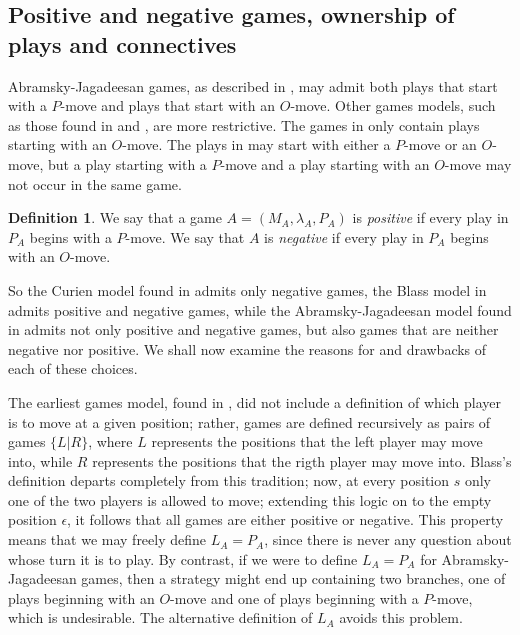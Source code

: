 \documentclass[11pt]{article} %
\theoremstyle{plain} %
\theoremstyle{definition} %
\newtheorem{definition}[theorem]{Definition}
\theoremstyle{note}
\theoremstyle{exercisestyle}
\newcommand{\emptyplay}{\epsilon}
\begin{document}
\subsection{Positive and negative games, ownership of plays and connectives}

Abramsky-Jagadeesan games, as described in \cite{abramskyjagadeesangames}, may admit both plays that start with a $P$-move and plays that start with an $O$-move.  Other games models, such as those found in \cite{blassgames} and \cite{curiengames}, are more restrictive.  The games in \cite{curiengames} only contain plays starting with an $O$-move.  The plays in \cite{blassgames} may start with either a $P$-move or an $O$-move, but a play starting with a $P$-move and a play starting with an $O$-move may not occur in the same game.

\begin{definition}
  We say that a game $A=(M_A,\lambda_A,P_A)$ is \emph{positive} if every play in $P_A$ begins with a $P$-move.
  We say that $A$ is \emph{negative} if every play in $P_A$ begins with an $O$-move.
\end{definition}

So the Curien model found in \cite{curiengames} admits only negative games, the Blass model in \cite{blassgames} admits positive and negative games, while the Abramsky-Jagadeesan model found in \cite{abramskyjagadeesangames} admits not only positive and negative games, but also games that are neither negative nor positive.  We shall now examine the reasons for and drawbacks of each of these choices.

The earliest games model, found in \cite{conwaygames}, did not include a definition of which player is to move at a given position; rather, games are defined recursively as pairs of games $\{L|R\}$, where $L$ represents the positions that the left player may move into, while $R$ represents the positions that the rigth player may move into.  Blass's definition departs completely from this tradition; now, at every position $s$ only one of the two players is allowed to move; extending this logic on to the empty position $\emptyplay$, it follows that all games are either positive or negative.  This property means that we may freely define $L_A=P_A$, since there is never any question about whose turn it is to play.  By contrast, if we were to define $L_A=P_A$ for Abramsky-Jagadeesan games, then a strategy might end up containing two branches, one of plays beginning with an $O$-move and one of plays beginning with a $P$-move, which is undesirable.  The alternative definition of $L_A$ avoids this problem.
\end{document}
